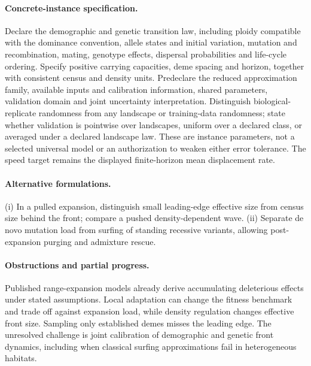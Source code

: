 \documentclass[11pt]{article}
\begin{document}
\paragraph{Concrete-instance specification.} Declare the demographic and genetic transition law, including ploidy compatible with the dominance convention, allele states and initial variation, mutation and recombination, mating, genotype effects, dispersal probabilities and life-cycle ordering. Specify positive carrying capacities, deme spacing and horizon, together with consistent census and density units. Predeclare the reduced approximation family, available inputs and calibration information, shared parameters, validation domain and joint uncertainty interpretation. Distinguish biological-replicate randomness from any landscape or training-data randomness; state whether validation is pointwise over landscapes, uniform over a declared class, or averaged under a declared landscape law. These are instance parameters, not a selected universal model or an authorization to weaken either error tolerance. The speed target remains the displayed finite-horizon mean displacement rate.

\paragraph{Alternative formulations.} (i) In a pulled expansion, distinguish small leading-edge effective size from census size behind the front; compare a pushed density-dependent wave. (ii) Separate de novo mutation load from surfing of standing recessive variants, allowing post-expansion purging and admixture rescue.
\paragraph{Obstructions and partial progress.} Published range-expansion models already derive accumulating deleterious effects under stated assumptions. Local adaptation can change the fitness benchmark and trade off against expansion load, while density regulation changes effective front size. Sampling only established demes misses the leading edge. The unresolved challenge is joint calibration of demographic and genetic front dynamics, including when classical surfing approximations fail in heterogeneous habitats.
\end{document}
